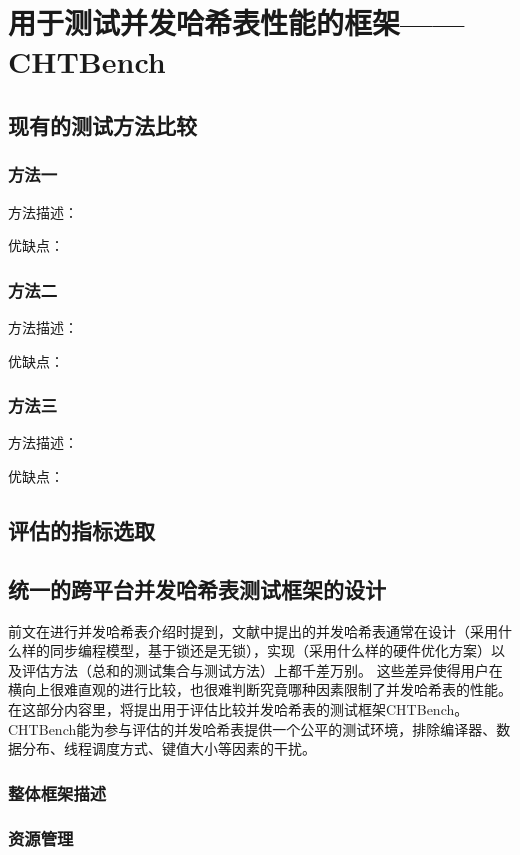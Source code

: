 
\chapter{用于测试并发哈希表性能的框架——CHTBench}

\section{现有的测试方法比较}
\subsection{方法一}
方法描述：

优缺点：

\subsection{方法二}
方法描述：

优缺点：

\subsection{方法三}
方法描述：

优缺点：

\section{评估的指标选取}

\section{统一的跨平台并发哈希表测试框架的设计}
\label{sec:design_framework}

前文在进行并发哈希表介绍时提到，文献中提出的并发哈希表通常在设计（采用什么样的同步编程模型，基于锁还是无锁），实现（采用什么样的硬件优化方案）以及评估方法（总和的测试集合与测试方法）上都千差万别。
这些差异使得用户在横向上很难直观的进行比较，也很难判断究竟哪种因素限制了并发哈希表的性能。
在这部分内容里，将提出用于评估比较并发哈希表的测试框架CHTBench。
CHTBench能为参与评估的并发哈希表提供一个公平的测试环境，排除编译器、数据分布、线程调度方式、键值大小等因素的干扰。

\subsection{整体框架描述}

\subsection{资源管理}

